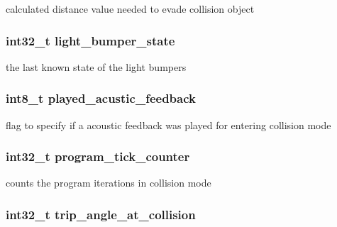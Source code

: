 calculated distance value needed to evade collision object \hypertarget{structcollision__data_ad40117dfe4921b4f52a9fcb49e76c3fa}{
\subsubsection[{light\-\_\-bumper\-\_\-state}]{\setlength{\rightskip}{0pt plus 5cm}int32\-\_\-t {\bf light\-\_\-bumper\-\_\-state}}}\label{structcollision__data_ad40117dfe4921b4f52a9fcb49e76c3fa}
the last known state of the light bumpers \hypertarget{structcollision__data_abc8ff00f84162de37e15e431872b7d3b}{
\subsubsection[{played\-\_\-acustic\-\_\-feedback}]{\setlength{\rightskip}{0pt plus 5cm}int8\-\_\-t {\bf played\-\_\-acustic\-\_\-feedback}}}\label{structcollision__data_abc8ff00f84162de37e15e431872b7d3b}
flag to specify if a acoustic feedback was played for entering collision mode \hypertarget{structcollision__data_ae863069398d3aad944262da21ddf2870}{
\subsubsection[{program\-\_\-tick\-\_\-counter}]{\setlength{\rightskip}{0pt plus 5cm}int32\-\_\-t {\bf program\-\_\-tick\-\_\-counter}}}\label{structcollision__data_ae863069398d3aad944262da21ddf2870}
counts the program iterations in collision mode \hypertarget{structcollision__data_a9bf88bb25b13b5a18e0fdc887e3cf81c}{
\subsubsection[{trip\-\_\-angle\-\_\-at\-\_\-collision}]{\setlength{\rightskip}{0pt plus 5cm}int32\-\_\-t {\bf trip\-\_\-angle\-\_\-at\-\_\-collision}}}\label{structcollision__data_a9bf88bb25b13b5a18e0fdc887e3cf81c}
